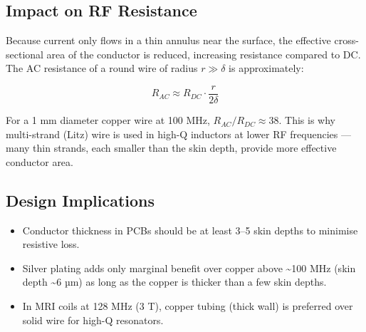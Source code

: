 				

\subsection{Impact on RF Resistance}

				

Because current only flows in a thin annulus near the surface, the effective cross-sectional area of the conductor is reduced, increasing resistance compared to DC. The AC resistance of a round wire of radius $r \gg \delta$ is approximately:

				
\[R_{AC} \approx R_{DC}\cdot\dfrac{r}{2\delta}\]

				

For a 1 mm diameter copper wire at 100 MHz, $R_{AC}/R_{DC} \approx 38$. This is why multi-strand (Litz) wire is used in high-Q inductors at lower RF frequencies — many thin strands, each smaller than the skin depth, provide more effective conductor area.

				

\subsection{Design Implications}

				
\begin{itemize}

					\item Conductor thickness in PCBs should be at least 3–5 skin depths to minimise resistive loss.

					\item Silver plating adds only marginal benefit over copper above \textasciitilde{}100 MHz (skin depth \textasciitilde{}6 µm) as long as the copper is thicker than a few skin depths.

					\item In MRI coils at 128 MHz (3 T), copper tubing (thick wall) is preferred over solid wire for high-Q resonators.

				
\end{itemize}



